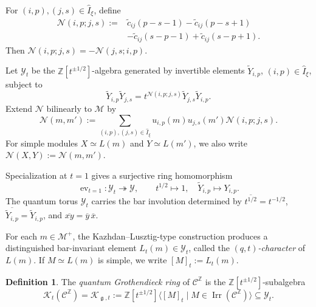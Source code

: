 \documentclass[12pt, reqno]{amsart}
\theoremstyle{plain}
\theoremstyle{definition}
\newtheorem{definition}[theorem]{Definition}
\numberwithin{equation}{section}
\newcommand{\ZZ}{\mathbb{Z}}
\newcommand{\fg}{\operatorname{\mathfrak{g}}}
\begin{document}
For \((i,p),(j,s)\in\widehat I_\xi\), define
\begin{equation}\label{eq:N-commutation-form}
    \begin{aligned}
        \mathcal N(i,p;j,s)
        :={}&\widetilde c_{ij}(p-s-1)
             -\widetilde c_{ij}(p-s+1)\\
            &-\widetilde c_{ij}(s-p-1)
             +\widetilde c_{ij}(s-p+1).
    \end{aligned}
\end{equation}
Then \(\mathcal N(i,p;j,s)=-\mathcal N(j,s;i,p)\).

Let \(\mathcal Y_t\) be the \(\ZZ[t^{\pm1/2}]\)-algebra generated by
invertible elements \(\widetilde Y_{i,p}\),
\((i,p)\in\widehat I_\xi\), subject to
\begin{equation}\label{eq:Y-t-commutation-relation}
    \widetilde Y_{i,p}\widetilde Y_{j,s}
    =t^{\mathcal N(i,p;j,s)}
      \widetilde Y_{j,s}\widetilde Y_{i,p}.
\end{equation}
Extend \(\mathcal N\) bilinearly to \(\mathcal M\) by
\begin{equation}\label{eq:N-form-on-monomials}
    \mathcal N(m,m')
    :=\sum_{(i,p),(j,s)\in\widehat I_\xi}
      u_{i,p}(m)u_{j,s}(m')\mathcal N(i,p;j,s).
\end{equation}
For simple modules \(X\simeq L(m)\) and \(Y\simeq L(m')\), we also
write \(\mathcal N(X,Y):=\mathcal N(m,m')\).

Specialization at \(t=1\) gives a surjective ring homomorphism
\begin{equation}\label{eq:t-one-specialization}
    \operatorname{ev}_{t=1}\colon\mathcal Y_t\twoheadrightarrow\mathcal Y,
    \qquad
    t^{1/2}\longmapsto1,
    \quad
    \widetilde Y_{i,p}\longmapsto Y_{i,p}.
\end{equation}
The quantum torus \(\mathcal Y_t\) carries the bar involution determined by
\(\overline{t^{1/2}}=t^{-1/2}\),
\(\overline{\widetilde Y_{i,p}}=\widetilde Y_{i,p}\), and
\(\overline{xy}=\overline y\,\overline x\).

For each \(m\in\mathcal M^+\), the Kazhdan--Lusztig-type construction
produces a distinguished bar-invariant element
\(L_t(m)\in\mathcal Y_t\), called the \emph{\((q,t)\)-character} of
\(L(m)\). If \(M\simeq L(m)\) is simple, we write
\([M]_t:=L_t(m)\).

\begin{definition}
    The \emph{quantum Grothendieck ring} of \(\mathscr C^{\ZZ}\) is the
    \(\ZZ[t^{\pm1/2}]\)-subalgebra
    \begin{equation}\label{eq:quantum-Grothendieck-ring}
        \mathcal{K}_t(\mathscr C^{\ZZ})
        =\mathcal K_{\fg,t}
        :=\ZZ[t^{\pm1/2}]
          \bigl\langle[M]_t
          \mid M\in\operatorname{Irr}(\mathscr C^{\ZZ})\bigr\rangle
        \subseteq\mathcal Y_t.
    \end{equation}
\end{definition}
\end{document}
